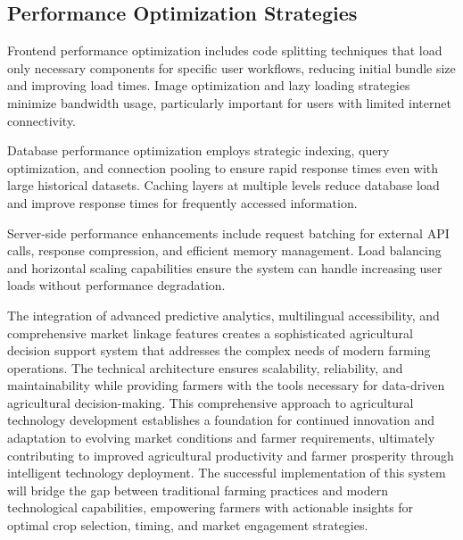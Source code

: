 \subsection{Performance Optimization Strategies}

Frontend performance optimization includes code splitting techniques that load only necessary components for specific user workflows, reducing initial bundle size and improving load times. Image optimization and lazy loading strategies minimize bandwidth usage, particularly important for users with limited internet connectivity.

Database performance optimization employs strategic indexing, query optimization, and connection pooling to ensure rapid response times even with large historical datasets. Caching layers at multiple levels reduce database load and improve response times for frequently accessed information.

Server-side performance enhancements include request batching for external API calls, response compression, and efficient memory management. Load balancing and horizontal scaling capabilities ensure the system can handle increasing user loads without performance degradation.

\vspace{0.75cm}
The integration of advanced predictive analytics, multilingual accessibility, and comprehensive market linkage features creates a sophisticated agricultural decision support system that addresses the complex needs of modern farming operations. The technical architecture ensures scalability, reliability, and maintainability while providing farmers with the tools necessary for data-driven agricultural decision-making. This comprehensive approach to agricultural technology development establishes a foundation for continued innovation and adaptation to evolving market conditions and farmer requirements, ultimately contributing to improved agricultural productivity and farmer prosperity through intelligent technology deployment. The successful implementation of this system will bridge the gap between traditional farming practices and modern technological capabilities, empowering farmers with actionable insights for optimal crop selection, timing, and market engagement strategies.